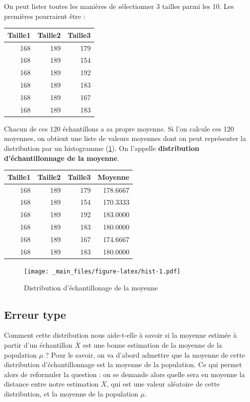 \documentclass[
  french,
]{book}
\begin{document}
On peut lister toutes les manières de sélectionner 3 tailles parmi les 10. Les premières pourraient être :

\begin{tabular}{r|r|r}
\hline
Taille1 & Taille2 & Taille3\\
\hline
168 & 189 & 179\\
\hline
168 & 189 & 154\\
\hline
168 & 189 & 192\\
\hline
168 & 189 & 183\\
\hline
168 & 189 & 167\\
\hline
168 & 189 & 183\\
\hline
\end{tabular}

Chacun de ces 120 échantillons a sa propre moyenne. Si l'on calcule ces 120 moyennes, on obtient une liste de valeurs moyennes dont on peut représenter la distribution par un histogramme (\ref{fig:hist}). On l'appelle \textbf{distribution d'échantillonnage de la moyenne}.

\begin{tabular}{r|r|r|r}
\hline
Taille1 & Taille2 & Taille3 & Moyenne\\
\hline
168 & 189 & 179 & 178.6667\\
\hline
168 & 189 & 154 & 170.3333\\
\hline
168 & 189 & 192 & 183.0000\\
\hline
168 & 189 & 183 & 180.0000\\
\hline
168 & 189 & 167 & 174.6667\\
\hline
168 & 189 & 183 & 180.0000\\
\hline
\end{tabular}

\begin{figure}
\centering
\texttt{[image: \_main\_files/figure-latex/hist-1.pdf]}
\caption{\label{fig:hist}Distribution d'échantillonage de la moyenne}
\end{figure}

\hypertarget{erreur-type}{%
\subsection{Erreur type}\label{erreur-type}}

Comment cette distribution nous aide-t-elle à savoir si la moyenne estimée à partir d'un échantillon \(\overline{X}\) est une bonne estimation de la moyenne de la population \(\mu\) ? Pour le savoir, on va d'abord admettre que la moyenne de cette distribution d'échantillonnage est la moyenne de la population. Ce qui permet alors de reformuler la question : on se demande alors quelle sera en moyenne la distance entre notre estimation \(\overline{X}\), qui est une valeur aléatoire de cette distribution, et la moyenne de la population \(\mu\).
\end{document}

